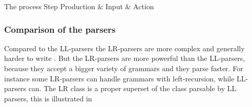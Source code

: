 	  {The process	    					 }
{Step  	 }{Production & Input       & Action                     }{
}

\subsubsection{Comparison of the parsers}
Compared to the LL-parsers the LR-parsers are more complex and generally harder
to write \cite[pp. 193]{sebesta2013}. But the LR-parsers are more powerful than
the LL-parsers, because they accept a bigger variety of grammars and they parse
faster. For instance some LR-parsers can handle grammars with left-recursion,
while LL-parsers can. The LR class is a proper superset of the class parsable
by LL parsers, this is illustrated in 

